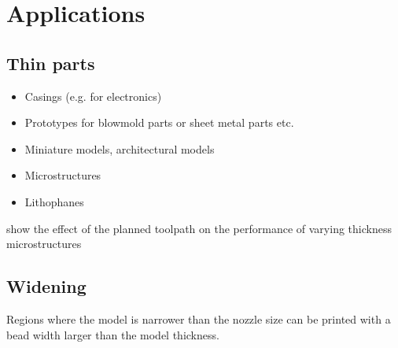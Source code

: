 \section{Applications}

\subsection{Thin parts}
\begin{itemize}
\item Casings (e.g. for electronics)
\item Prototypes for blowmold parts or sheet metal parts etc.
\item Miniature models, architectural models
\item Microstructures
\item Lithophanes
\end{itemize}

show the effect of the planned toolpath on the performance of varying thickness microstructures



\subsection{Widening}
Regions where the model is narrower than the nozzle size can be printed with a bead width larger than the model thickness.